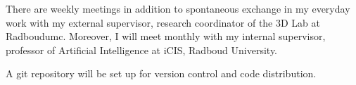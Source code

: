 \documentclass{article}
\begin{document}
There are weekly meetings in addition to spontaneous exchange in my everyday work with my external supervisor, research coordinator of the 3D Lab at Radboudumc. Moreover, I will meet monthly with my internal supervisor, professor of Artificial Intelligence at iCIS, Radboud University.

A git repository will be set up for version control and code distribution.



\end{document}
